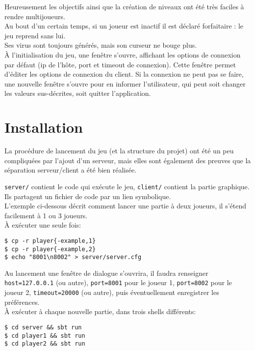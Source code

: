 \documentclass[a4paper,french]{article}
\newcommand{\ttt}[1]{\texttt{#1}}
\begin{document}
Heureusement les objectifs ainsi que la création de niveaux ont été très faciles à rendre multijoueurs.\\

Au bout d'un certain temps, si un joueur est inactif il est déclaré forfaitaire : le jeu reprend sans lui.\\
Ses virus sont toujours générés, mais son curseur ne bouge plus.\\

\`A l'initialisation du jeu, une fenêtre s'ouvre, affichant les options de connexion par défaut (ip de l'hôte, port et
timeout de connexion). Cette fenêtre permet d'éditer les options de connexion du client. Si la connexion ne peut pas se
faire, une nouvelle fenêtre s'ouvre pour en informer l'utilisateur, qui peut soit changer les valeurs sus-décrites, soit
quitter l'application.


\section{Installation}

La procédure de lancement du jeu (et la structure du projet) ont été un peu compliquées par l'ajout d'un serveur,
mais elles sont également des preuves que la séparation serveur/client a été bien réalisée.

\ttt{server/} contient le code qui exécute le jeu, \ttt{client/} contient la partie graphique. Ils partagent
un fichier de code par un lien symbolique.\\

L'exemple ci-dessous décrit comment lancer une partie à deux joueurs, il s'étend facilement à 1 ou 3 joueurs.\\

\`A exécuter une seule fois:
\begin{lstlisting}
$ cp -r player{-example,1}
$ cp -r player{-example,2}
$ echo "8001\n8002" > server/server.cfg
\end{lstlisting}
Au lancement une fenêtre de dialogue s'ouvrira, il faudra renseigner \ttt{host=127.0.0.1} (ou autre),
\ttt{port=8001} pour le joueur 1, \ttt{port=8002} pour le joueur 2, \ttt{timeout=20000} (ou autre),
puis \'eventuellement enregistrer les pr\'ef\'erences.\\


\`A exécuter à chaque nouvelle partie, dans trois shells différents:
\begin{lstlisting}
$ cd server && sbt run
$ cd player1 && sbt run
$ cd player2 && sbt run
\end{lstlisting}~\\
\end{document}
